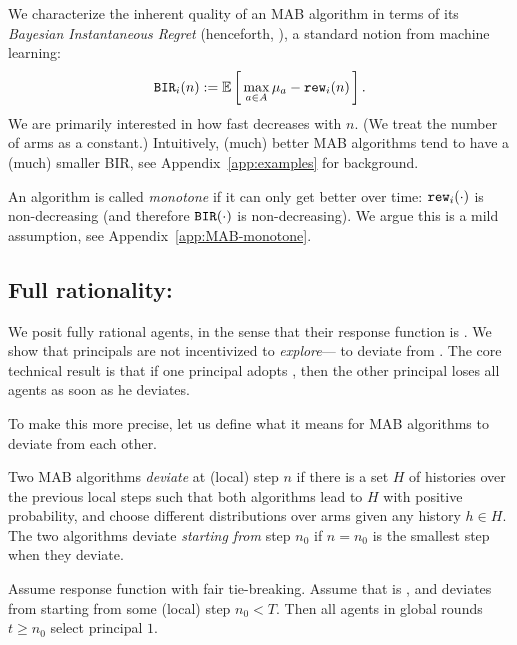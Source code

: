 We characterize the inherent quality of an MAB algorithm in terms of its \emph{Bayesian Instantaneous Regret} (henceforth, \BIR), a standard notion from machine learning:
\begin{align}\label{eq:theory-BIR-defn}
\BIR_i(n) := \E\sbr{ \max_{a\in A} \mu_a - \rew_i(n)}.
\end{align}
We are primarily interested in how fast \BIR decreases with $n$. (We treat the number of arms as a constant.) Intuitively, (much) better MAB algorithms tend to have a (much) smaller BIR, see Appendix~\ref{app:examples} for background.

An algorithm is called \emph{monotone} if it can only get better over time: $\mathtt{rew}_i(\cdot)$ is non-decreasing (and therefore $\mathtt{BIR}(\cdot)$ is non-decreasing). We argue this is a mild assumption, see
Appendix~\ref{app:MAB-monotone}.



\subsection{Full rationality: \HardMax}
\label{sec:theory-HM}

We posit fully rational agents, in the sense that their response function is \HardMax. We show that principals are not incentivized to \emph{explore}--- \ie to deviate from \DynGreedy. The core technical result is that if one principal adopts \DynGreedy, then the other principal loses all agents as soon as he deviates.

To make this more precise, let us define what it means for MAB algorithms to deviate from each other.

\begin{definition}
Two MAB algorithms \emph{deviate} at (local) step $n$ if there is a set $H$ of histories over the previous local steps such that both algorithms lead to $H$ with positive probability, and choose different distributions over arms given any history $h\in H$. The two algorithms deviate \emph{starting from} step $n_0$ if $n=n_0$ is the smallest step when they deviate.
\end{definition}

\begin{theorem}\label{thm:DG-dominance}
Assume \HardMax response function with fair tie-breaking. Assume that \alg[1] is \DynGreedy, and \alg[2] deviates from \DynGreedy starting from some (local) step $n_0<T$. Then all agents in global rounds $t\geq n_0$ select principal $1$.
\end{theorem}

